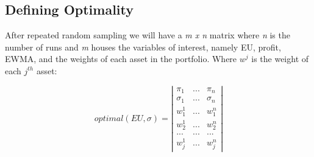 \documentclass[12pt]{article}
\begin{document}
\subsection{Defining Optimality}
After repeated random sampling we will have a \emph{m x n} matrix where \emph{n} is the number of runs and \emph{m} houses the variables of interest, namely EU, profit, EWMA, and the weights of each asset in the portfolio. Where $w^{j}$ is the weight of each $j^{th}$ asset:

\[optimal(EU, \sigma) = \left | \begin{array}{ccc}
\pi_{1} & ... & \pi_{n} \\
\sigma_{1} & ... & \sigma_{n} \\
w_{1}^{1}  & ... & w_{1}^{n} \\
w_{2}^{1}  & ... & w_{2}^{n} \\
... & ... & ... \\
w_{j}^{1}  & ... & w_{j}^{n} \end{array} \right |\]
\end{document}
